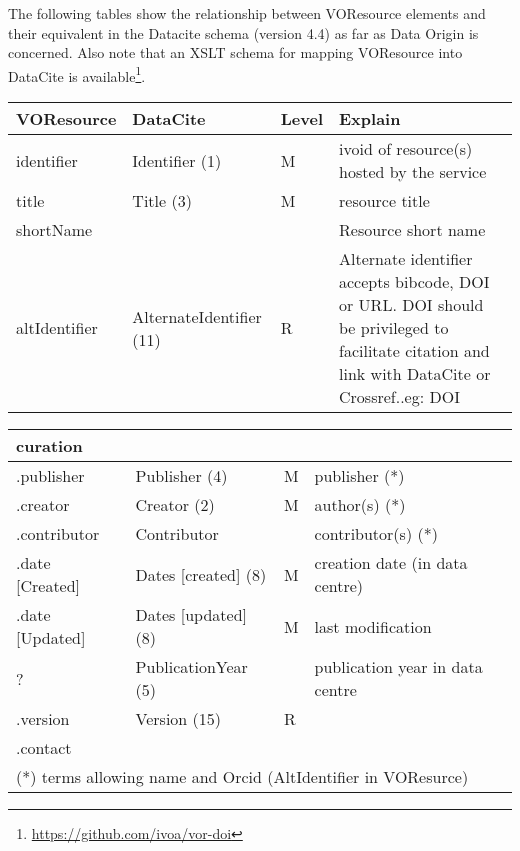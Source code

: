 \documentclass[11pt,a4paper]{ivoa}
\begin{document}
The following tables show the relationship between VOResource elements and their equivalent in the Datacite schema (version 4.4) as far as Data Origin is concerned. Also note that an XSLT schema for mapping VOResource into DataCite is available\footnote{\url{https://github.com/ivoa/vor-doi}}.

\begin{tabular}{|p{3cm}|p{4cm}|p{1cm}|p{5cm}|} \hline
\textbf{VOResource} & \textbf{DataCite} & \textbf{Level} & \textbf{Explain} \\ \hline
identifier    &Identifier (1) &M & ivoid of resource(s) hosted by the service\\ \hline
title         &Title (3) &M  & resource title\\ \hline
shortName     &&& Resource short name\\ \hline
altIdentifier & AlternateIdentifier (11)& R &
              Alternate identifier accepts bibcode, DOI or URL. DOI should be privileged to facilitate citation and link with DataCite or Crossref..eg: DOI \\ \hline
\end{tabular}

\begin{tabular}{|p{3cm}|p{4cm}|p{1cm}|p{5cm}|} \hline
\multicolumn{4}{|l|}{\textbf{curation}} \\ \hline
.publisher     & Publisher (4) & M &publisher (*)\\ \hline
.creator       & Creator (2) & M & author(s) (*)\\ \hline
.contributor   & Contributor & & contributor(s) (*)\\ \hline
.date [Created]& Dates [created] (8)& M & creation date (in data centre)\\ \hline
.date [Updated]& Dates [updated] (8)& M & last modification\\ \hline
  ?            & PublicationYear (5) & & publication year in data centre\\ \hline
.version       & Version (15) & R &\\ \hline
.contact       & &&\\ \hline
\multicolumn{4}{l}{\footnotesize(*) terms allowing name and Orcid (AltIdentifier in VOResurce)} \\
\end{tabular}
\end{document}

